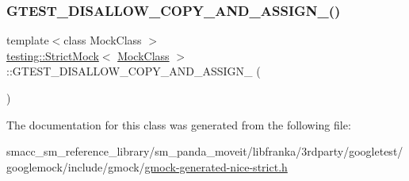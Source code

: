 \subsubsection{\texorpdfstring{G\+T\+E\+S\+T\+\_\+\+D\+I\+S\+A\+L\+L\+O\+W\+\_\+\+C\+O\+P\+Y\+\_\+\+A\+N\+D\+\_\+\+A\+S\+S\+I\+G\+N\+\_\+()}{GTEST\_DISALLOW\_COPY\_AND\_ASSIGN\_()}}
{\footnotesize\ttfamily template$<$class Mock\+Class $>$ \\
\hyperlink{classtesting_1_1StrictMock}{testing\+::\+Strict\+Mock}$<$ \hyperlink{classMockClass}{Mock\+Class} $>$\+::G\+T\+E\+S\+T\+\_\+\+D\+I\+S\+A\+L\+L\+O\+W\+\_\+\+C\+O\+P\+Y\+\_\+\+A\+N\+D\+\_\+\+A\+S\+S\+I\+G\+N\+\_\+ (\begin{DoxyParamCaption}\item[{\hyperlink{classtesting_1_1StrictMock}{Strict\+Mock}$<$ \hyperlink{classMockClass}{Mock\+Class} $>$}]{ }\end{DoxyParamCaption})\hspace{0.3cm}{\ttfamily [private]}}



The documentation for this class was generated from the following file\+:\begin{DoxyCompactItemize}
\item 
smacc\+\_\+sm\+\_\+reference\+\_\+library/sm\+\_\+panda\+\_\+moveit/libfranka/3rdparty/googletest/googlemock/include/gmock/\hyperlink{gmock-generated-nice-strict_8h}{gmock-\/generated-\/nice-\/strict.\+h}\end{DoxyCompactItemize}
